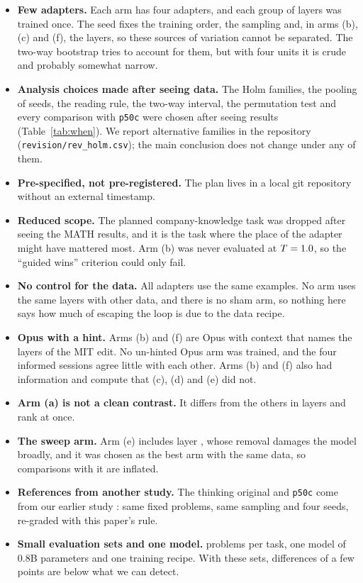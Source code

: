 \documentclass[11pt]{article}
\begin{document}
\begin{itemize}[nosep,leftmargin=*]
\item \textbf{Few adapters.} Each arm has four adapters, and each group of layers was trained once. The seed fixes the training order, the sampling and, in arms (b), (c) and (f), the layers, so these sources of variation cannot be separated. The two-way bootstrap tries to account for them, but with four units it is crude and probably somewhat narrow.
\item \textbf{Analysis choices made after seeing data.} The Holm families, the pooling of seeds, the reading rule, the two-way interval, the permutation test and every comparison with \texttt{p50c} were chosen after seeing results (Table~\ref{tab:when}). We report alternative families in the repository (\texttt{revision/rev\_holm.csv}); the main conclusion does not change under any of them.
\item \textbf{Pre-specified, not pre-registered.} The plan lives in a local git repository without an external timestamp.
\item \textbf{Reduced scope.} The planned company-knowledge task was dropped after seeing the MATH results, and it is the task where the place of the adapter might have mattered most. Arm (b) was never evaluated at $T=1.0$, so the ``guided wins'' criterion could only fail.
\item \textbf{No control for the data.} All \NLora{} adapters use the same \NExamples{} examples. No arm uses the same layers with other data, and there is no sham arm, so nothing here says how much of escaping the loop is due to the data recipe.
\item \textbf{Opus with a hint.} Arms (b) and (f) are Opus with context that names the layers of the MIT edit. No un-hinted Opus arm was trained, and the four informed sessions agree little with each other. Arms (b) and (f) also had information and compute that (c), (d) and (e) did not.
\item \textbf{Arm (a) is not a clean contrast.} It differs from the others in layers and rank at once.
\item \textbf{The sweep arm.} Arm (e) includes layer , whose removal damages the model broadly, and it was chosen as the best arm with the same data, so comparisons with it are inflated.
\item \textbf{References from another study.} The thinking original and \texttt{p50c} come from our earlier study \citep{giraldo2026}: same fixed problems, same sampling and four seeds, re-graded with this paper's rule.
\item \textbf{Small evaluation sets and one model.} \NMath{} problems per task, one model of 0.8B parameters and one training recipe. With these sets, differences of a few points are below what we can detect.
\end{itemize}
\end{document}
